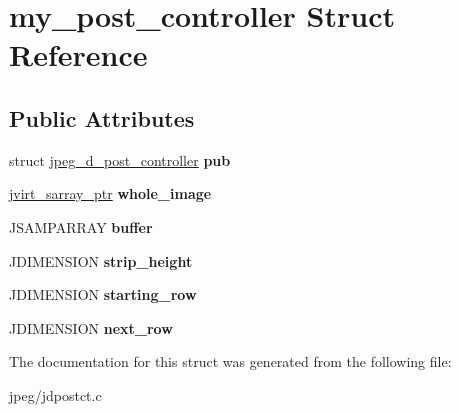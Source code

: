 \hypertarget{structmy__post__controller}{}\section{my\+\_\+post\+\_\+controller Struct Reference}
\label{structmy__post__controller}
\subsection*{Public Attributes}
\begin{DoxyCompactItemize}
\item 
struct \hyperlink{structjpeg__d__post__controller}{jpeg\+\_\+d\+\_\+post\+\_\+controller} {\bfseries pub}\hypertarget{structmy__post__controller_a4618ce845c38c4c563bdd28af061b727}{}\label{structmy__post__controller_a4618ce845c38c4c563bdd28af061b727}

\item 
\hyperlink{structjvirt__sarray__control}{jvirt\+\_\+sarray\+\_\+ptr} {\bfseries whole\+\_\+image}\hypertarget{structmy__post__controller_ac2336623f2e802993b35b7db30053b68}{}\label{structmy__post__controller_ac2336623f2e802993b35b7db30053b68}

\item 
J\+S\+A\+M\+P\+A\+R\+R\+AY {\bfseries buffer}\hypertarget{structmy__post__controller_aa571ce1fd2b5171a40d3b18d1496a2cf}{}\label{structmy__post__controller_aa571ce1fd2b5171a40d3b18d1496a2cf}

\item 
J\+D\+I\+M\+E\+N\+S\+I\+ON {\bfseries strip\+\_\+height}\hypertarget{structmy__post__controller_a50ed0e70f9acab0995bbffb3aef6e9aa}{}\label{structmy__post__controller_a50ed0e70f9acab0995bbffb3aef6e9aa}

\item 
J\+D\+I\+M\+E\+N\+S\+I\+ON {\bfseries starting\+\_\+row}\hypertarget{structmy__post__controller_a1e762395815d8f552d1a412cb5201575}{}\label{structmy__post__controller_a1e762395815d8f552d1a412cb5201575}

\item 
J\+D\+I\+M\+E\+N\+S\+I\+ON {\bfseries next\+\_\+row}\hypertarget{structmy__post__controller_a9aa9e3077c24ae10e47972c1955c6d38}{}\label{structmy__post__controller_a9aa9e3077c24ae10e47972c1955c6d38}

\end{DoxyCompactItemize}


The documentation for this struct was generated from the following file\+:\begin{DoxyCompactItemize}
\item 
jpeg/jdpostct.\+c\end{DoxyCompactItemize}
